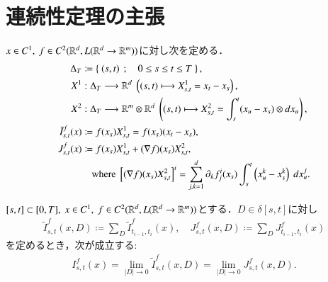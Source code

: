 \section{連続性定理の主張}
	\begin{screen}
		\begin{dfn}[記号の定義]
			$x \in C^1,\ f \in C^2(\mathbb{R}^d,L(\mathbb{R}^d \rightarrow \mathbb{R}^m))$に対し次を定める．
			\begin{align}
				\Delta_T &\coloneqq \Set{(s,t)}{0 \leq s \leq t \leq T}, \\
				X^1 &:\Delta_T \longrightarrow \R^d\ \left( (s,t) \longmapsto X^1_{s,t} = x_t - x_s \right), \\
				X^2 &:\Delta_T \longrightarrow \R^m \otimes \R^d\ \left( (s,t) \longmapsto X^2_{s,t} = \int_s^t (x_u - x_s) \otimes dx_u \right), \\
				\tilde{I}^f_{s,t}(x) &\coloneqq f(x_s)X^1_{s,t} = f(x_s)(x_t - x_s), \\
				J^f_{s,t}(x) &\coloneqq f(x_s)X^1_{s,t} + (\nabla f)(x_s)X^2_{s,t}, \\
					&\quad \mbox{where\ } \left[ (\nabla f)(x_s)X^2_{s,t} \right]^i = \sum_{j,k=1}^d \partial_k f^i_j(x_s) \int_s^t \left(x^k_u - x^k_s \right)\ dx^j_u.
			\end{align}
		\end{dfn}
	\end{screen}
	
	\begin{screen}
		\begin{thm}
			$[s,t] \subset [0,T],\ x \in C^1,\ f \in C^2(\mathbb{R}^d,L(\mathbb{R}^d \rightarrow \mathbb{R}^m))$とする．$D \in \delta[s,t]$に対し
			\begin{align}
				\tilde{I}^f_{s,t}(x,D) \coloneqq \sum_D \tilde{I}^f_{t_{i-1},t_i}(x),
				\quad J^f_{s,t}(x,D) \coloneqq \sum_D J^f_{t_{i-1},t_i}(x)
			\end{align}
			を定めるとき，次が成立する:
			\begin{align}
				I^f_{s,t}(x) = \lim_{|D| \to 0} \tilde{I}^f_{s,t}(x,D)
				= \lim_{|D| \to 0} J^f_{s,t}(x,D).
			\end{align}
		\end{thm}
	\end{screen}
	
